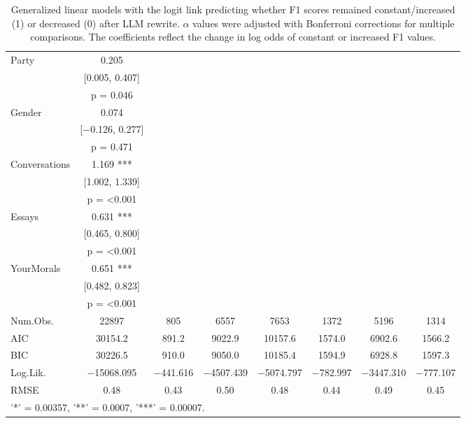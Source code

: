 \begin{table*}[ht]
{\begin{tabular}[t]{lccccccc}
Party & \num{0.205} &  &  &  &  &  & \\
 & {}[\num{0.005}, \num{0.407}] &  &  &  &  &  & \\
 & p = \num{0.046} &  &  &  &  &  & \\
Gender & \num{0.074} &  &  &  &  &  & \\
 & {}[\num{-0.126}, \num{0.277}] &  &  &  &  &  & \\
 & p = \num{0.471} &  &  &  &  &  & \\
Conversations & \num{1.169}  *** &  &  &  &  &  & \\
 & {}[\num{1.002}, \num{1.339}] &  &  &  &  &  & \\
 & p = \num{<0.001} &  &  &  &  &  \vphantom{2} & \\
Essays & \num{0.631}  *** &  &  &  &  &  & \\
 & {}[\num{0.465}, \num{0.800}] &  &  &  &  &  & \\
 & p = \num{<0.001} &  &  &  &  &  \vphantom{1} & \\
YourMorals & \num{0.651}  *** &  &  &  &  &  & \\
 & {}[\num{0.482}, \num{0.823}] &  &  &  &  &  & \\
 & p = \num{<0.001} &  &  &  &  &  & \\
\midrule
Num.Obs. & \num{22897} & \num{805} & \num{6557} & \num{7653} & \num{1372} & \num{5196} & \num{1314}\\
AIC & \num{30154.2} & \num{891.2} & \num{9022.9} & \num{10157.6} & \num{1574.0} & \num{6902.6} & \num{1566.2}\\
BIC & \num{30226.5} & \num{910.0} & \num{9050.0} & \num{10185.4} & \num{1594.9} & \num{6928.8} & \num{1597.3}\\
Log.Lik. & \num{-15068.095} & \num{-441.616} & \num{-4507.439} & \num{-5074.797} & \num{-782.997} & \num{-3447.310} & \num{-777.107}\\
RMSE & \num{0.48} & \num{0.43} & \num{0.50} & \num{0.48} & \num{0.44} & \num{0.49} & \num{0.45}\\
\bottomrule
\multicolumn{8}{l}{\rule{0pt}{1em}'*' =  0.00357, '**' = 0.0007, '***' = 0.00007.}\\
\end{tabular}}
\caption{Generalized linear models with the logit link predicting whether F1 scores remained constant/increased (1) or decreased (0) after LLM rewrite. $\alpha$ values were adjusted with Bonferroni corrections for multiple comparisons. The coefficients reflect the change in log odds of constant or increased F1 values.}
\end{table*}